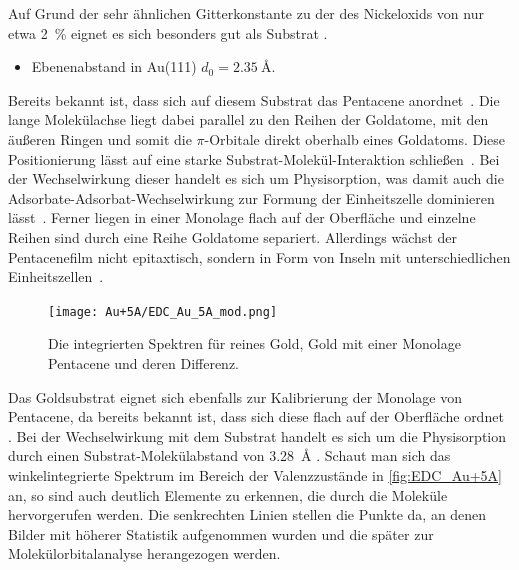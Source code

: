             Auf Grund der sehr ähnlichen Gitterkonstante zu der des Nickeloxids von nur etwa \SI{2}{\percent} eignet es sich besonders gut als Substrat \cite{NiO_36}.
            \begin{itemize}
                \item Ebenenabstand in Au(111) $d_0 = \SI{2.35}{\angstrom}$.\textbf{\cite{5A_1}}
            \end{itemize}

            Bereits bekannt ist, dass sich auf diesem Substrat das Pentacene anordnet~\cite{5A_1, 5A_3}.
            Die lange Molekülachse liegt dabei parallel zu den Reihen der Goldatome, mit den äußeren Ringen und somit die $\pi$-Orbitale direkt oberhalb eines Goldatoms.
            Diese Positionierung lässt auf eine starke Substrat-Molekül-Interaktion schließen~\cite{5A_3}.
            Bei der Wechselwirkung dieser handelt es sich um Physisorption, was damit auch die Adsorbate-Adsorbat-Wechselwirkung zur Formung der Einheitszelle dominieren lässt~\cite{5A_4}.
            Ferner liegen in einer Monolage flach auf der Oberfläche und einzelne Reihen sind durch eine Reihe Goldatome separiert.
            Allerdings wächst der Pentacenefilm nicht epitaxtisch, sondern in Form von Inseln mit unterschiedlichen Einheitszellen~\cite{5A_3}.

            \begin{figure}
                \centering
                \texttt{[image: Au+5A/EDC\_Au\_5A\_mod.png]}
                \caption{Die integrierten Spektren für reines Gold, Gold mit einer Monolage Pentacene und deren Differenz.}
                \label{fig:EDC_Au+5A}
            \end{figure}
            Das Goldsubstrat eignet sich ebenfalls zur Kalibrierung der Monolage von Pentacene, da bereits bekannt ist, dass sich diese flach auf der Oberfläche ordnet \cite{5A_1}.
            Bei der Wechselwirkung mit dem Substrat handelt es sich um die Physisorption durch einen Substrat-Molekülabstand von \SI{3.28}{\angstrom} \cite{5A_1}.
            Schaut man sich das winkelintegrierte Spektrum im Bereich der Valenzzustände in \autoref{fig:EDC_Au+5A} an, so sind auch deutlich Elemente zu erkennen, die durch die Moleküle hervorgerufen werden.
            Die senkrechten Linien stellen die Punkte da, an denen Bilder mit höherer Statistik aufgenommen wurden und die später zur Molekülorbitalanalyse herangezogen werden.
    
